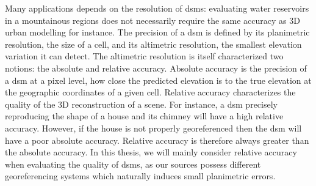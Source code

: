 Many applications depends on the resolution of \acrshort{dsm}s: evaluating water reservoirs in a mountainous regions does not necessarily require the same accuracy as 3D urban modelling for instance. The precision of a \acrshort{dsm} is defined by its planimetric resolution, \ie the size of a cell, and its altimetric resolution, \ie the smallest elevation variation it can detect. The altimetric resolution is itself characterized two notions: the absolute and relative accuracy. Absolute accuracy is the precision of a \acrshort{dsm} at a pixel level, \ie how close the predicted elevation is to the true elevation at the geographic coordinates of a given cell. Relative accuracy characterizes the quality of the 3D reconstruction of a scene. For instance, a \acrshort{dsm} precisely reproducing the shape of a house and its chimney will have a high relative accuracy. However, if the house is not properly georeferenced then the \acrshort{dsm} will have a poor absolute accuracy. Relative accuracy is therefore always greater than the absolute accuracy. In this thesis, we will mainly consider relative accuracy when evaluating the quality of \acrshort{dsm}s, as our sources possess different georeferencing systems which naturally induces small planimetric errors. 

